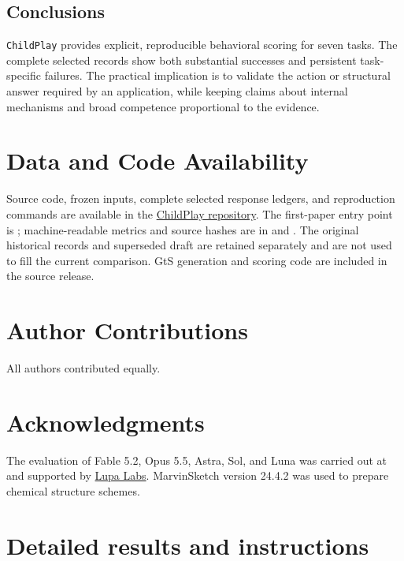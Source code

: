 \documentclass[12pt,letterpaper]{article}
\begin{document}
\subsection*{Conclusions}
\texttt{ChildPlay} provides explicit, reproducible behavioral scoring for seven tasks. The complete selected records show both substantial successes and persistent task-specific failures. The practical implication is to validate the action or structural answer required by an application, while keeping claims about internal mechanisms and broad competence proportional to the evidence.

\section*{Data and Code Availability}
Source code, frozen inputs, complete selected response ledgers, and reproduction commands are available in the \href{https://github.com/BlueVelvetSackOfGoldPotatoes/child-play}{ChildPlay repository}. The first-paper entry point is ; machine-readable metrics and source hashes are in  and . The original historical records and superseded draft are retained separately and are not used to fill the current comparison. GtS generation and scoring code are included in the source release.

\section*{Author Contributions}
All authors contributed equally.

\section*{Acknowledgments}
The evaluation of Fable 5.2, Opus 5.5, Astra, Sol, and Luna was carried out at and supported by \href{https://hellolupa.com}{Lupa Labs}. MarvinSketch version 24.4.2 was used to prepare chemical structure schemes.


\clearpage
\appendix
\section{Detailed results and instructions}


\clearpage
\end{document}
